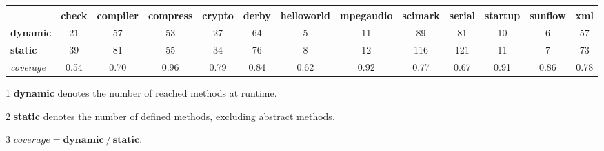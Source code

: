 \documentclass{article}
\begin{document}
\begin{table}[!htbp]\centering
\begin{threeparttable}[b]
\begin{tabular}{|l|c|c|c|c|c|c|c|c|c|c|c|c|}
\hline
 & check & compiler & compress & crypto & derby & helloworld & mpegaudio & scimark & serial & startup & sunflow & xml\\
\hline
\hline
\textbf{dynamic} & 21 & 57 & 53 & 27 & 64 & 5 & 11 & 89 & 81 & 10 & 6 & 57\\
\textbf{static} & 39 & 81 & 55 & 34 & 76 & 8 & 12 & 116 & 121 & 11 & 7 & 73\\
\textit{coverage} & 0.54 & 0.70 & 0.96 & 0.79 & 0.84 & 0.62 & 0.92 & 0.77 & 0.67 & 0.91 & 0.86 & 0.78\\
\hline
\end{tabular}
\begin{tablenotes}
  \item[1] \textbf{dynamic} denotes the number of reached methods at runtime.
  \item[2] \textbf{static} denotes the number of defined methods, excluding abstract methods.
  \item[3] $\textit{coverage} = \textbf{dynamic}\ /\ \textbf{static}$.
\end{tablenotes}
\end{threeparttable}
\end{table}
\end{document}
